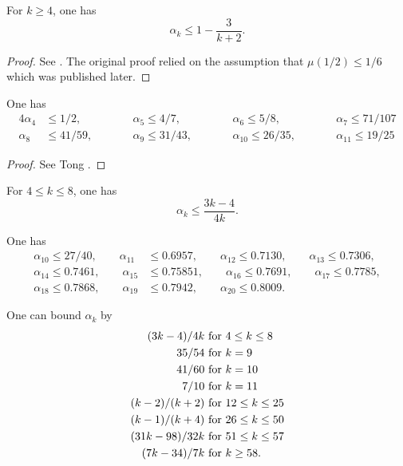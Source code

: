 \begin{lemma}\label{hl-alpha}
For $k \ge 4$, one has
\[
\alpha_k \leq 1 - \frac{3}{k + 2}.
\]
\end{lemma}
\begin{proof}
See \cite{hardy_littlewood_approximate_1923}. The original proof relied on the assumption that $\mu(1/2) \le 1/6$ which was published later. 
\end{proof}

\begin{lemma}
One has
\begin{alignat*}{4}
\alpha_4 &\le 1/2,\qquad &&\alpha_5 \le 4/7,\qquad &&\alpha_6 \le 5/8,\qquad &&\alpha_7 \le 71/107\\
\alpha_8 &\le 41/59,\qquad &&\alpha_9 \le 31/43,\qquad &&\alpha_{10} \le 26/35,\qquad &&\alpha_{11}\le 19/25
\end{alignat*}
\end{lemma}
\begin{proof}
See Tong \cite{Tong_divisor}.
\end{proof}

\begin{theorem}\cite{heathbrown_mean_1981} For $4 \le k \le 8$, one has 
\[
\alpha_k \leq \frac{3k-4}{4k}.
\]
\end{theorem}

\begin{theorem}\cite{ivic_ouellet_1989} One has
\begin{align*}
\alpha_{10} \le 27/40,\qquad \alpha_{11} &\le 0.6957,\qquad \alpha_{12} \le 0.7130,\qquad \alpha_{13} \le 0.7306,\\
\alpha_{14} \le 0.7461,\qquad \alpha_{15} &\le 0.75851,\qquad \alpha_{16} \le 0.7691,\qquad \alpha_{17} \le 0.7785,\\
\alpha_{18} \le 0.7868,\qquad \alpha_{19} &\le 0.7942,\qquad \alpha_{20} \le 0.8009.
\end{align*}
\end{theorem}
\begin{theorem}\cite[Theorem 13.12]{ivic}  One can bound $\alpha_k$ by
    \begin{align*}
        (3k-4)/4k & \hbox{ for } 4 \leq k \leq 8 \\
        35/54 & \hbox{ for } k = 9 \\
        41/60 & \hbox{ for } k = 10 \\
        7/10 & \hbox{ for } k = 11 \\
        (k-2)/(k+2) & \hbox{ for } 12 \leq k \leq 25 \\
        (k-1)/(k+4) & \hbox{ for } 26 \leq k \leq 50 \\
        (31k-98)/32k & \hbox{ for } 51 \leq k \leq 57 \\
        (7k-34)/7k & \hbox{ for } k \geq 58.
    \end{align*}
\end{theorem}

